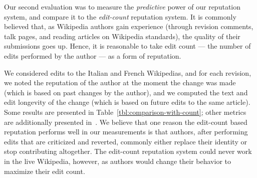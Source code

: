 Our second evaluation was to measure the \textit{predictive}
power of our reputation system, and compare it to the
\textit{edit-count} reputation system.
It is commonly believed that, as Wikipedia authors gain
experience (through revision comments, talk pages,
and reading articles on Wikipedia standards), the quality
of their submissions goes up.
Hence, it is reasonable to take edit count --- the number of edits
performed by the author --- as a form of reputation.

We considered edits to the Italian and French Wikipedias, and
for each revision, we noted the reputation of the author at the
moment the change was made (which is based on past changes by the author),
and we computed the text and edit longevity of the change (which
is based on future edits to the same article).
Some results are presented in Table~\ref{tbl:comparison-with-count};
other metrics are additionally presented in~\cite{Adler2007}.
We believe that one reason the edit-count based reputation
performs well in our measurements is that authors, after
performing edits that are criticized and reverted,
commonly either replace their identity or stop contributing altogether.
The edit-count reputation system could never work in the live Wikipedia, however,
as authors would change their behavior to maximize their edit count.

